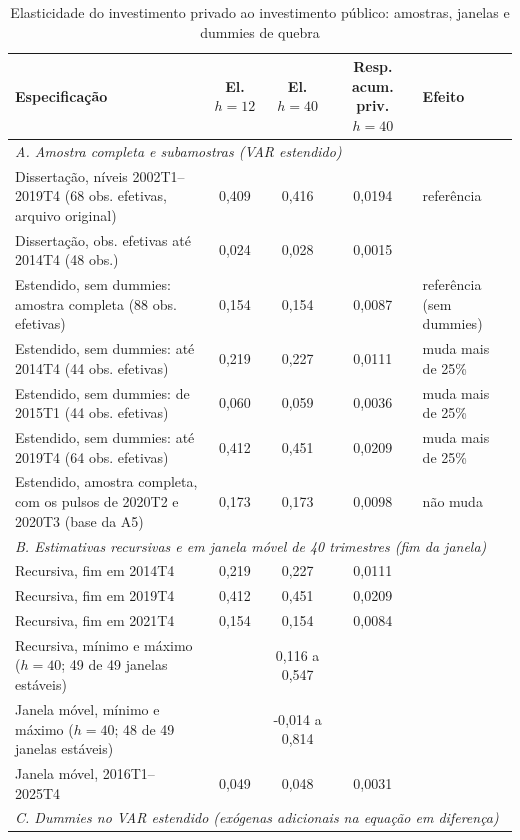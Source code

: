 \begin{table}[htbp]
\centering
\caption{Elasticidade do investimento privado ao investimento p\'ublico: amostras, janelas e dummies de quebra}
\label{tab:a4_elast}
\tiny
\begin{tabular}{lcccl}
\toprule
Especifica\c{c}\~ao & El. $h = 12$ & El. $h = 40$ & Resp. acum. priv. $h = 40$ & Efeito \\
\midrule
\multicolumn{5}{l}{\textit{A. Amostra completa e subamostras (VAR estendido)}} \\
Disserta\c{c}\~ao, n\'iveis 2002T1--2019T4 (68 obs. efetivas, arquivo original) & 0{,}409 & 0{,}416 & 0{,}0194 & refer\^encia \\
Disserta\c{c}\~ao, obs. efetivas at\'e 2014T4 (48 obs.) & 0{,}024 & 0{,}028 & 0{,}0015 &  \\
Estendido, sem dummies: amostra completa (88 obs. efetivas) & 0{,}154 & 0{,}154 & 0{,}0087 & refer\^encia (sem dummies) \\
Estendido, sem dummies: at\'e 2014T4 (44 obs. efetivas) & 0{,}219 & 0{,}227 & 0{,}0111 & muda mais de 25\% \\
Estendido, sem dummies: de 2015T1 (44 obs. efetivas) & 0{,}060 & 0{,}059 & 0{,}0036 & muda mais de 25\% \\
Estendido, sem dummies: at\'e 2019T4 (64 obs. efetivas) & 0{,}412 & 0{,}451 & 0{,}0209 & muda mais de 25\% \\
Estendido, amostra completa, com os pulsos de 2020T2 e 2020T3 (base da A5) & 0{,}173 & 0{,}173 & 0{,}0098 & n\~ao muda \\
\midrule
\multicolumn{5}{l}{\textit{B. Estimativas recursivas e em janela m\'ovel de 40 trimestres (fim da janela)}} \\
Recursiva, fim em 2014T4 & 0{,}219 & 0{,}227 & 0{,}0111 &  \\
Recursiva, fim em 2019T4 & 0{,}412 & 0{,}451 & 0{,}0209 &  \\
Recursiva, fim em 2021T4 & 0{,}154 & 0{,}154 & 0{,}0084 &  \\
Recursiva, m\'inimo e m\'aximo ($h = 40$; 49 de 49 janelas est\'aveis) & & 0{,}116 a 0{,}547 & & \\
Janela m\'ovel, m\'inimo e m\'aximo ($h = 40$; 48 de 49 janelas est\'aveis) & & -0{,}014 a 0{,}814 & & \\
Janela m\'ovel, 2016T1--2025T4 & 0{,}049 & 0{,}048 & 0{,}0031 &  \\
\midrule
\multicolumn{5}{l}{\textit{C. Dummies no VAR estendido (ex\'ogenas adicionais na equa\c{c}\~ao em diferen\c{c}a)}} \\

\end{tabular}
\end{table}

